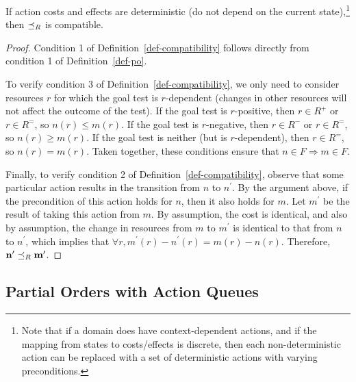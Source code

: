 \documentclass[letterpaper]{article}
\theoremstyle{plain} \newtheorem{theorem}{Theorem} \newtheorem{proposition}{Proposition} \newtheorem{lemma}{Lemma}
\theoremstyle{definition} \newtheorem{definition}{Definition} \newtheorem{conjecture}{Conjecture} \newtheorem*{example}{Example}
\theoremstyle{remark} \newtheorem*{remark}{Remark} \newtheorem*{note}{Note} \newtheorem{case}{Case}
\begin{document}
\begin{claim}{}{\label{clm-po-compatible}}
	If action costs and effects are deterministic (do not depend on the current state),\footnote{Note that if a domain does have context-dependent actions, and if the mapping from states to costs/effects is discrete, then each non-deterministic action can be replaced with a set of deterministic actions with varying preconditions.} then $\preceq_R$ is compatible.
\end{claim}
\begin{proof}
	Condition 1 of Definition~\ref{def-compatibility} follows directly from condition 1 of Definition~\ref{def-po}.
	
	To verify condition 3 of Definition~\ref{def-compatibility}, we only need to consider resources $r$ for which the goal test is $r$-dependent (changes in other resources will not affect the outcome of the test). If the goal test is $r$-positive, then $r \in R^+$ or $r \in R^=$, so $n(r) \le m(r)$. If the goal test is $r$-negative, then $r \in R^-$ or $r \in R^=$, so $n(r) \ge m(r)$. If the goal test is neither (but is $r$-dependent), then $r \in R^=$, so $n(r) = m(r)$. Taken together, these conditions ensure that $n \in F \Rightarrow m \in F$.
	
	Finally, to verify condition 2 of Definition~\ref{def-compatibility}, observe that some particular action results in the transition from $n$ to $n^\prime$. By the argument above, if the precondition of this action holds for $n$, then it also holds for $m$. Let
  $m^\prime$ be the result of taking this action from $m$. By assumption, the cost is identical, and also by assumption, the change in resources from $m$ to $m^\prime$ is identical to that from $n$ to $n^\prime$, which implies that $\forall r, m^\prime(r) -
  n^\prime(r) = m(r) - n(r)$. Therefore, $\mathbf{n^\prime} \preceq_R \mathbf{m^\prime}$.
\end{proof}

\subsection{Partial Orders with Action Queues}

\newcommand{\poq}{\preceq_Q}
\end{document}
